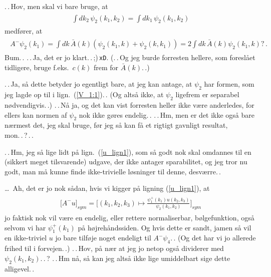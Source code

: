\documentclass{report}
\begin{document}
.\,.\,Hov, men skal vi bare bruge, at 
\begin{align}
\begin{aligned}
	\int  dk_2\, \psi_2(k_1, k_2) = \int  dk_1\, \psi_2(k_1, k_2)
\end{aligned}
\end{align}
medfører, at
\begin{align}
\begin{aligned}
	A^-\psi_2(k_1) = 
		\int dk\, \bar{A}(k)( \psi_2(k_1, k) + \psi_2(k, k_1) ) = 
			2 \int dk\, \bar{A}(k)\psi_2(k_1, k)?\,.
\end{aligned}
\end{align}
Bum.\,. .\,.\,Ja, det er jo klart.\,.\,;)\,\texttt{xD}. (.\,.\,Og jeg burde forresten hellere, som foreslået tidligere, bruge f.eks.\ $c(k)$ frem for $\bar{A}(k)$.\,.)

.\,.\,Ja, så dette betyder jo egentligt bare, at jeg kan antage, at $\psi_2$ har formen, som jeg lagde op til i lign.\ (\ref{V_1:1}).\,. (Og altså ikke, at $\psi_2$ ligefrem er separabel nødvendigvis.\,.)
.\,.\,Nå ja, og det kan vist forresten heller ikke være anderledes, for ellers kan normen af $\psi_2$ nok ikke gøres endelig.\,. .\,.\,Hm, men er det ikke også bare nærmest det, jeg skal bruge, før jeg så kan få et rigtigt gavnligt resultat, mon.\,.\,?\,.\,. 

.\,.\,Hm, jeg så lige lidt på lign.\ (\ref{u_lign1}), som så godt nok skal omdannes til en (sikkert meget tilsvarende) udgave, der ikke antager sparabilitet, og jeg tror nu godt, man må kunne finde ikke-trivielle løsninger til denne, desværre.\,. 


\ldots\ Ah, det er jo nok sådan, hvis vi kigger på ligning (\ref{u_lign1}), at 
\begin{align}
\begin{aligned}
	\lbrack A^- u \rbrack_{sym} = 
		\bigg[(k_1, k_2, k_3) \mapsto 
			\frac{\psi_1^+(k_1) u(k_2, k_3) }{ \psi_2(k_1, k_2)}\bigg]_{sym}
	\label{u_lign2}
\end{aligned}
\end{align}
jo faktisk nok vil være en endelig, eller rettere normaliserbar, bølgefunktion, også selvom vi har $\psi_1^+(k_1)$ på højrehåndssiden. Og hvis dette er sandt, jamen så vil en ikke-triviel $u$ jo bare tilføje noget endeligt til $A^- \psi_4$.\,. (Og det har vi jo allerede frihed til i forvejen.\,.) .\,.\,Hov, på nær at jeg jo netop også dividerer med $\psi_2(k_1, k_2)$.\,.\,? .\,.\,Hm nå, så kan jeg altså ikke lige umiddelbart sige dette alligevel.\,. 
\end{document}
